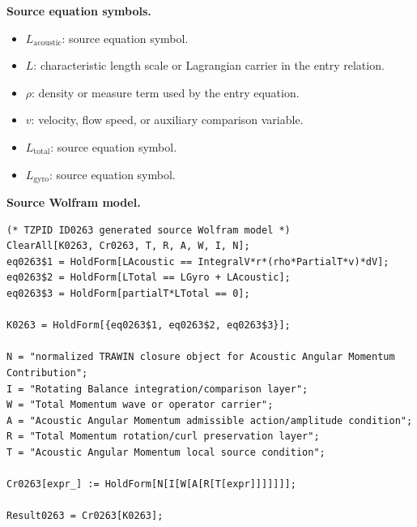 \begin{minipage}[t]{0.49\linewidth}
\begingroup
\small
\raggedright
\textbf{Source equation symbols.}\par
\begin{itemize}[leftmargin=1.35em,itemsep=1pt,topsep=1pt,parsep=0pt]
    \item $L_{\mathrm{acoustic}}$: source equation symbol.
    \item $L$: characteristic length scale or Lagrangian carrier in the entry relation.
    \item $\rho$: density or measure term used by the entry equation.
    \item $v$: velocity, flow speed, or auxiliary comparison variable.
    \item $L_{\mathrm{total}}$: source equation symbol.
    \item $L_{\mathrm{gyro}}$: source equation symbol.
\end{itemize}
\endgroup
\end{minipage}\hfill
\begin{minipage}[t]{0.47\linewidth}
\begingroup
\scriptsize
\raggedright
\textbf{Source Wolfram model.}\par
\begin{Verbatim}[fontsize=\tiny,breaklines=true,breakanywhere=true]
(* TZPID ID0263 generated source Wolfram model *)
ClearAll[K0263, Cr0263, T, R, A, W, I, N];
eq0263$1 = HoldForm[LAcoustic == IntegralV*r*(rho*PartialT*v)*dV];
eq0263$2 = HoldForm[LTotal == LGyro + LAcoustic];
eq0263$3 = HoldForm[partialT*LTotal == 0];

K0263 = HoldForm[{eq0263$1, eq0263$2, eq0263$3}];

N = "normalized TRAWIN closure object for Acoustic Angular Momentum Contribution";
I = "Rotating Balance integration/comparison layer";
W = "Total Momentum wave or operator carrier";
A = "Acoustic Angular Momentum admissible action/amplitude condition";
R = "Total Momentum rotation/curl preservation layer";
T = "Acoustic Angular Momentum local source condition";

Cr0263[expr_] := HoldForm[N[I[W[A[R[T[expr]]]]]]];

Result0263 = Cr0263[K0263];
\end{Verbatim}
\endgroup
\end{minipage}

